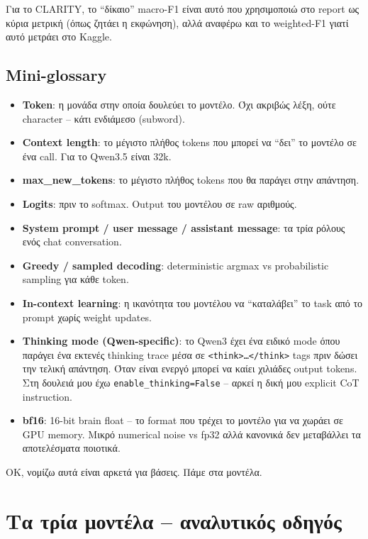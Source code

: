 \documentclass[12pt]{fphw}
\begin{document}
Για το CLARITY, το ``δίκαιο'' macro-F1 είναι αυτό που χρησιμοποιώ στο report ως κύρια μετρική (όπως ζητάει η εκφώνηση), αλλά αναφέρω και το weighted-F1 γιατί αυτό μετράει στο Kaggle.

\subsection{Mini-glossary}

\begin{itemize}
    \item \textbf{Token}: η μονάδα στην οποία δουλεύει το μοντέλο. Όχι ακριβώς λέξη, ούτε character -- κάτι ενδιάμεσο (subword).
    \item \textbf{Context length}: το μέγιστο πλήθος tokens που μπορεί να ``δει'' το μοντέλο σε ένα call. Για το Qwen3.5 είναι 32k.
    \item \textbf{max\_new\_tokens}: το μέγιστο πλήθος tokens που θα παράγει στην απάντηση.
    \item \textbf{Logits}: πριν το softmax. Output του μοντέλου σε raw αριθμούς.
    \item \textbf{System prompt / user message / assistant message}: τα τρία ρόλους ενός chat conversation.
    \item \textbf{Greedy / sampled decoding}: deterministic argmax vs probabilistic sampling για κάθε token.
    \item \textbf{In-context learning}: η ικανότητα του μοντέλου να ``καταλάβει'' το task από το prompt χωρίς weight updates.
    \item \textbf{Thinking mode (Qwen-specific)}: το Qwen3 έχει ένα ειδικό mode όπου παράγει ένα εκτενές thinking trace μέσα σε \texttt{<think>\dots</think>} tags πριν δώσει την τελική απάντηση. Όταν είναι ενεργό μπορεί να καίει χιλιάδες output tokens. Στη δουλειά μου έχω \texttt{enable\_thinking=False} -- αρκεί η δική μου explicit CoT instruction.
    \item \textbf{bf16}: 16-bit brain float -- το format που τρέχει το μοντέλο για να χωράει σε GPU memory. Μικρό numerical noise vs fp32 αλλά κανονικά δεν μεταβάλλει τα αποτελέσματα ποιοτικά.
\end{itemize}

OK, νομίζω αυτά είναι αρκετά για βάσεις. Πάμε στα μοντέλα.

\section{Τα τρία μοντέλα -- αναλυτικός οδηγός}
\end{document}
